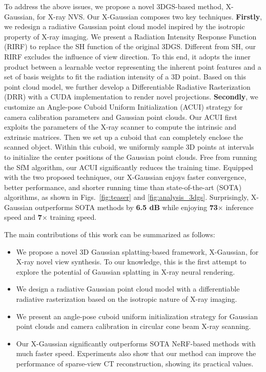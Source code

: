 \documentclass[runningheads]{llncs}
\begin{document}
To address the above issues, we propose a novel 3DGS-based method, X-Gaussian, for X-ray NVS. Our X-Gaussian composes two key techniques. \textbf{Firstly}, we redesign a radiative Gaussian point cloud model inspired by the isotropic property of X-ray imaging. We present a Radiation Intensity Response Function (RIRF) to replace the SH function of the original 3DGS. Different from SH, our RIRF excludes the influence of view direction. To this end, it adopts the inner product between a learnable vector representing the inherent point features and a set of basis weights to fit the radiation intensity of a 3D point. Based on this point cloud model, we further develop a Differentiable Radiative Rasterization (DRR) with a CUDA implementation to render novel projections. \textbf{Secondly}, we customize an Angle-pose Cuboid Uniform Initialization (ACUI) strategy for camera calibration parameters and Gaussian point clouds. Our ACUI first exploits the parameters of the X-ray scanner to compute the intrinsic and extrinsic matrices. Then we set up a cuboid that can completely enclose the scanned object. Within this cuboid, we uniformly sample 3D points at intervals to initialize the center positions of the Gaussian point clouds. Free from running the  SfM algorithm, our ACUI significantly reduces the training time. Equipped with the two proposed techniques, our X-Gaussian enjoys faster convergence, better performance, and shorter running time than state-of-the-art (SOTA) algorithms, as shown in Figs.~\ref{fig:teaser} and \ref{fig:analysis_3dgs}. Surprisingly, X-Gaussian outperforms SOTA methods by \textbf{6.5 dB} while enjoying \textbf{73$\times$} inference speed and \textbf{7$\times$} training speed.



The main contributions of this work can be summarized as follows:
\begin{itemize}
	\vspace{-1.5mm}
	\item We propose a novel 3D Gaussian splatting-based framework, X-Gaussian, for X-ray novel view synthesis. To our knowledge, this is the first attempt to explore the potential of Gaussian splatting in X-ray neural rendering.
	\vspace{1mm}
	\item We design a radiative Gaussian point cloud model with a differentiable radiative rasterization based on the isotropic nature of X-ray imaging.
	\vspace{1mm}
	\item We present an angle-pose cuboid uniform initialization strategy for Gaussian point clouds and camera calibration in circular cone beam X-ray scanning.
	\vspace{1mm}
	\item Our X-Gaussian significantly outperforms SOTA NeRF-based methods with much faster speed. Experiments also show that our method can improve the performance of sparse-view CT reconstruction, showing its practical values.
\end{itemize}
\end{document}
